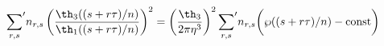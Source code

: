 \begin{equation}
  {\sum_{r,s}}' n_{r,s} \left( 
   {\th_3((s+r\tau)/n)\over \th_1((s+r\tau)/n)} \right)^2
     = \left({\th_3\over 2\pi \eta^3}\right)^2 {\sum_{r,s}}' n_{r,s}
   \bigg( \wp((s+r\tau)/n) -{\rm const } \bigg)
\end{equation}

